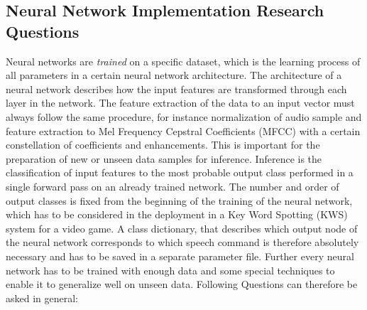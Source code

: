 \subsection{Neural Network Implementation Research Questions}\label{sec:intro_rq_nn}
Neural networks are \emph{trained} on a specific dataset, which is the learning process of all parameters in a certain neural network architecture. 
The architecture of a neural network describes how the input features are transformed through each layer in the network.
The feature extraction of the data to an input vector must always follow the same procedure, for instance normalization of audio sample and feature extraction to Mel Frequency Cepstral Coefficients (MFCC) with a certain constellation of coefficients and enhancements.
This is important for the preparation of new or unseen data samples for inference.
Inference is the classification of input features to the most probable output class performed in a single forward pass on an already trained network.
The number and order of output classes is fixed from the beginning of the training of the neural network, which has to be considered in the deployment in a Key Word Spotting (KWS) system for a video game.
A class dictionary, that describes which output node of the neural network corresponds to which speech command is therefore absolutely necessary and has to be saved in a separate parameter file.
Further every neural network has to be trained with enough data and some special techniques to enable it to generalize well on unseen data.
Following Questions can therefore be asked in general:

